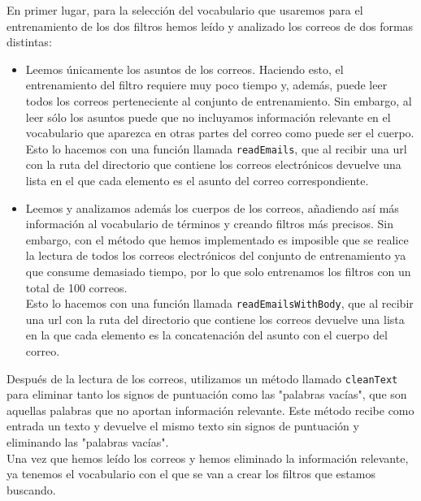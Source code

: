 \documentclass[conference,a4paper]{IEEEtran}
\begin{document}
En primer lugar, para la selección del vocabulario que usaremos para el entrenamiento de los dos filtros hemos leído y analizado los correos de dos formas distintas: \\
\begin{itemize}
\item Leemos únicamente los asuntos de los correos. Haciendo esto, el entrenamiento del filtro requiere muy poco tiempo y, además, puede leer todos los correos perteneciente al conjunto de entrenamiento. Sin embargo, al leer sólo los asuntos puede que no incluyamos información relevante en el vocabulario que aparezca en otras partes del correo como puede ser el cuerpo. \\

Esto lo hacemos con una función llamada \texttt{readEmails}, que al recibir una url con la ruta del directorio que contiene los correos electrónicos devuelve una lista en el que cada elemento es el asunto del correo correspondiente. \\

\item Leemos y analizamos además los cuerpos de los correos, añadiendo así más información al vocabulario de términos y creando filtros más precisos. Sin embargo, con el método que hemos implementado es imposible que se realice la lectura de todos los correos electrónicos del conjunto de entrenamiento ya que consume demasiado tiempo, por lo que solo entrenamos los filtros con un total de 100 correos. \\

Esto lo hacemos con una función llamada \texttt{readEmailsWithBody}, que al recibir una url con la ruta del directorio que contiene los correos devuelve una lista en la que cada elemento es la concatenación del asunto con el cuerpo del correo. \\
\end{itemize}

Después de la lectura de los correos, utilizamos un método llamado \texttt{cleanText} para eliminar tanto los signos de puntuación como las "palabras vacías", que son aquellas palabras que no aportan información relevante. Este método recibe como entrada un texto y devuelve el mismo texto sin signos de puntuación y eliminando las "palabras vacías". \\

Una vez que hemos leído los correos y hemos eliminado la información relevante, ya tenemos el vocabulario con el que se van a crear los filtros que estamos buscando. \\
\end{document}
